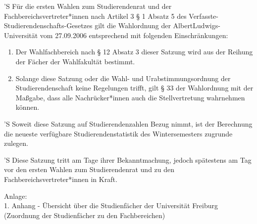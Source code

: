 \documentclass[fontsize=12pt,parskip=half]{scrartcl}
\begin{document}
\begin{contract}


  'S Für die ersten Wahlen zum Studierendenrat und der Fachbereichsvertreter*innen
  nach Artikel 3 § 1 Absatz 5 des Verfasste-Studierendenschafts-Gesetzes gilt
  die Wahlordnung der AlbertLudwigs-Universität vom 27.09.2006 entsprechend mit
  folgenden Einschränkungen:
  \begin{enumerate}[\qquad 1.]
    \item Der Wahlfachbereich nach § 12 Absatz 3 dieser Satzung wird aus der
      Reihung der Fächer der Wahlfakultät bestimmt.
    \item Solange diese Satzung oder die Wahl- und Urabstimmungsordnung der
      Studierendenschaft keine Regelungen trifft, gilt § 33 der Wahlordnung mit
      der Maßgabe, dass alle Nachrücker*innen auch die Stellvertretung
      wahrnehmen können.
  \end{enumerate}



  'S Soweit diese Satzung auf Studierendenzahlen Bezug nimmt, ist der Berechnung
  die neueste verfügbare Studierendenstatistik des Wintersemesters zugrunde
  zulegen.

  'S Diese Satzung tritt am Tage ihrer Bekanntmachung, jedoch spätestens am Tag vor
  den ersten Wahlen zum Studierendenrat und zu den Fachbereichsvertreter*innen
  in Kraft.

\end{contract}

\vspace{2cm}
Anlage: \\
1. Anhang - Übersicht über die Studienfächer der Universität Freiburg \\
\qquad (Zuordnung der Studienfächer zu den Fachbereichen)
\end{document}
